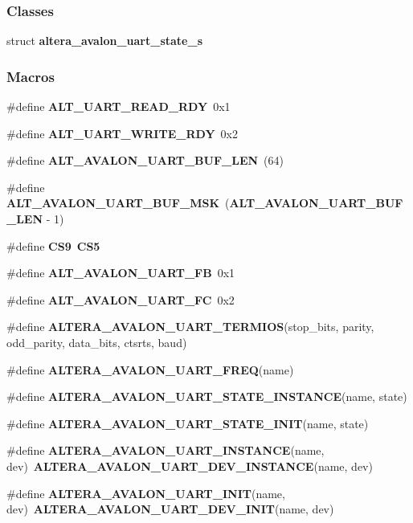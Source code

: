 \subsubsection*{Classes}
\begin{DoxyCompactItemize}
\item 
struct {\bf altera\+\_\+avalon\+\_\+uart\+\_\+state\+\_\+s}
\end{DoxyCompactItemize}
\subsubsection*{Macros}
\begin{DoxyCompactItemize}
\item 
\#define {\bf A\+L\+T\+\_\+\+U\+A\+R\+T\+\_\+\+R\+E\+A\+D\+\_\+\+R\+DY}~0x1
\item 
\#define {\bf A\+L\+T\+\_\+\+U\+A\+R\+T\+\_\+\+W\+R\+I\+T\+E\+\_\+\+R\+DY}~0x2
\item 
\#define {\bf A\+L\+T\+\_\+\+A\+V\+A\+L\+O\+N\+\_\+\+U\+A\+R\+T\+\_\+\+B\+U\+F\+\_\+\+L\+EN}~(64)
\item 
\#define {\bf A\+L\+T\+\_\+\+A\+V\+A\+L\+O\+N\+\_\+\+U\+A\+R\+T\+\_\+\+B\+U\+F\+\_\+\+M\+SK}~({\bf A\+L\+T\+\_\+\+A\+V\+A\+L\+O\+N\+\_\+\+U\+A\+R\+T\+\_\+\+B\+U\+F\+\_\+\+L\+EN} -\/ 1)
\item 
\#define {\bf C\+S9}~{\bf C\+S5}
\item 
\#define {\bf A\+L\+T\+\_\+\+A\+V\+A\+L\+O\+N\+\_\+\+U\+A\+R\+T\+\_\+\+FB}~0x1
\item 
\#define {\bf A\+L\+T\+\_\+\+A\+V\+A\+L\+O\+N\+\_\+\+U\+A\+R\+T\+\_\+\+FC}~0x2
\item 
\#define {\bf A\+L\+T\+E\+R\+A\+\_\+\+A\+V\+A\+L\+O\+N\+\_\+\+U\+A\+R\+T\+\_\+\+T\+E\+R\+M\+I\+OS}(stop\+\_\+bits, parity, odd\+\_\+parity,  data\+\_\+bits, ctsrts, baud)
\item 
\#define {\bf A\+L\+T\+E\+R\+A\+\_\+\+A\+V\+A\+L\+O\+N\+\_\+\+U\+A\+R\+T\+\_\+\+F\+R\+EQ}(name)
\item 
\#define {\bf A\+L\+T\+E\+R\+A\+\_\+\+A\+V\+A\+L\+O\+N\+\_\+\+U\+A\+R\+T\+\_\+\+S\+T\+A\+T\+E\+\_\+\+I\+N\+S\+T\+A\+N\+CE}(name,  state)
\item 
\#define {\bf A\+L\+T\+E\+R\+A\+\_\+\+A\+V\+A\+L\+O\+N\+\_\+\+U\+A\+R\+T\+\_\+\+S\+T\+A\+T\+E\+\_\+\+I\+N\+IT}(name,  state)
\item 
\#define {\bf A\+L\+T\+E\+R\+A\+\_\+\+A\+V\+A\+L\+O\+N\+\_\+\+U\+A\+R\+T\+\_\+\+I\+N\+S\+T\+A\+N\+CE}(name,  dev)~{\bf A\+L\+T\+E\+R\+A\+\_\+\+A\+V\+A\+L\+O\+N\+\_\+\+U\+A\+R\+T\+\_\+\+D\+E\+V\+\_\+\+I\+N\+S\+T\+A\+N\+CE}(name, dev)
\item 
\#define {\bf A\+L\+T\+E\+R\+A\+\_\+\+A\+V\+A\+L\+O\+N\+\_\+\+U\+A\+R\+T\+\_\+\+I\+N\+IT}(name,  dev)~{\bf A\+L\+T\+E\+R\+A\+\_\+\+A\+V\+A\+L\+O\+N\+\_\+\+U\+A\+R\+T\+\_\+\+D\+E\+V\+\_\+\+I\+N\+IT}(name, dev)
\end{DoxyCompactItemize}
